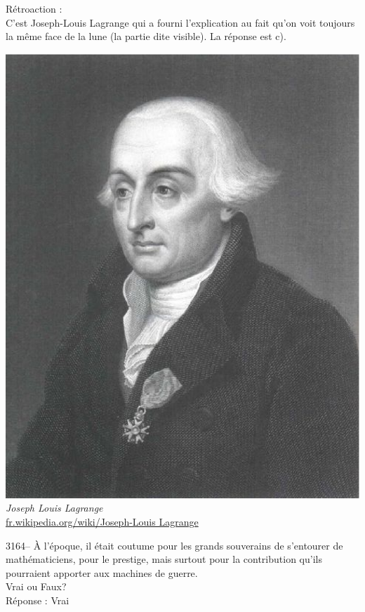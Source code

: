 \documentclass[letterpaper, 12pt]{article}
\begin{document}
R\'etroaction :\\
C'est Joseph-Louis Lagrange qui a fourni l'explication au fait qu'on voit toujours la m\^eme face de la lune (la partie dite visible). La r\'eponse est c).
\begin{center}
\includegraphics[scale=0.2]{Lagrange.eps}\\
\emph{{\small Joseph Louis Lagrange}}\\
\href{http://fr.wikipedia.org/wiki/Joseph-Louis_Lagrange}{fr.wikipedia.org/wiki/Joseph-Louis Lagrange}\\[5mm]
\end{center}



3164-- \`A l'\'epoque, il \'etait coutume pour les grands souverains de s'entourer de math\'ematiciens, pour le prestige, mais surtout pour la contribution qu'ils pourraient apporter aux machines de guerre.\\
Vrai ou Faux?\\

R\'eponse : Vrai\\
\end{document}
